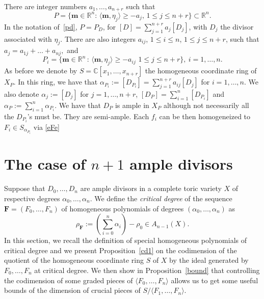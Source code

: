 \documentclass[a4paper,11pt]{amsart}
\newcommand{\C}{\mathbb{C}}
\newcommand{\R}{\mathbb{R}}
\newcommand{\bfm}{{\boldsymbol{m}}}
\newcommand{\bfF}{{\boldsymbol{F}}}
\numberwithin{thm}{section}
\numberwithin{equation}{section}
\theoremstyle{definition}
\theoremstyle{plain}
\begin{document}
There are integer numbers $a_1, \dots, a_{n+r}$ such that
\begin{equation}\label{P}
P=\{\bfm\in\R^n:\, \langle \bfm,\eta_j\rangle\geq-a_j,\, 1\leq j\leq n+r\}\subset\R^n.
\end{equation}
In the notation of~\eqref{pd}, $P= P_D$, for
$[D] = \sum_{j=1}^{n+r} a_j [D_j]$, with $D_j$ the divisor associated with $\eta_j$.
 There are also integers $a_{ij}$, $1\leq i\leq n$,  $1\leq j\leq n+r$, such that $a_j=a_{1j}+\ldots+a_{nj},$ and 
\begin{equation}\label{PPi}
P_i =\{\bfm \in \R^n\, : \, \langle \bfm,\eta_j \rangle \ge - a_{ij}\,\, 1\leq j\leq n+r\},\ i=1,\ldots, n.
\end{equation}
  As before we denote by $S = \C[x_1,\ldots, x_{n+r}] $ the homogeneous coordinate ring of $X_P$.
  In this ring, we have that $\alpha_{P_i}:=[D_{P_i}]=\sum_{j=1}^{n+r}a_{ij}[D_j]$ for $i=1,\ldots, n$. We also denote  $\alpha_j:=[D_j]$ for $j=1, \dots, n+r$, 
$[D_P]=\sum_{i=1}^n [D_{P_i}]$ and $\alpha_P:=\sum_{i=1}^n \alpha_{P_i}$.  We have that $D_P$ is ample in $X_P$ although not necessarily all the $D_{P_i}$'s must be. They are semi-ample. Each $f_i$ can be then homogeneized to $F_i\in S_{\alpha_{P_i}}$ via \eqref{eFe}



\section{The case of $n+1$ ample divisors}\label{sec:critical}

Suppose that $D_0,\ldots, D_n$ are ample divisors in a complete toric variety $X$ of respective degrees $\alpha_0,\ldots, \alpha_n.$
We define the {\em critical degree} of the sequence $\bfF = (F_0, \dots, F_n)$ of homogeneous polynomials of degrees $(\alpha_0, \dots,\alpha_n)$  as
\begin{equation}\label{ro}
\rho_\bfF:=\left(\sum_{i=0}^n\alpha_i\right)-\rho_0\in A_{n-1}(X).
\end{equation}
In this section, we recall the definition of special homogeneous polynomials of critical degree and we present Proposition~\ref{cd1} on the codimension of the quotient of the homogeneous coordinate ring $S$ of $X$ by the ideal generated by $F_0, \dots, F_n$ at critical degree. We then show in Proposition~\ref{bound} that
controlling the codimension of some graded pieces of $\langle F_0,\ldots, F_n\rangle$  allows us to get  some useful bounds of the dimension of crucial pieces of $S/\langle F_1,\ldots, F_n\rangle$.
\end{document}
